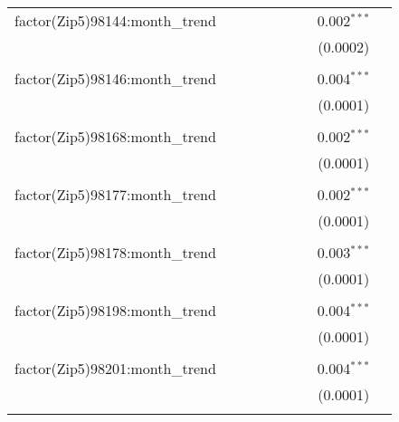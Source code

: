 \begin{table}[H]
{\begin{tabular}{@{\extracolsep{5pt}}lcccccccc}
  factor(Zip5)98144:month\_trend &  &  &  &  &  &  & 0.002$^{***}$ &  \\  

   &  &  &  &  &  &  & (0.0002) &  \\  

   & & & & & & & & \\  

  factor(Zip5)98146:month\_trend &  &  &  &  &  &  & 0.004$^{***}$ &  \\  

   &  &  &  &  &  &  & (0.0001) &  \\  

   & & & & & & & & \\  

  factor(Zip5)98168:month\_trend &  &  &  &  &  &  & 0.002$^{***}$ &  \\  

   &  &  &  &  &  &  & (0.0001) &  \\  

   & & & & & & & & \\  

  factor(Zip5)98177:month\_trend &  &  &  &  &  &  & 0.002$^{***}$ &  \\  

   &  &  &  &  &  &  & (0.0001) &  \\  

   & & & & & & & & \\  

  factor(Zip5)98178:month\_trend &  &  &  &  &  &  & 0.003$^{***}$ &  \\  

   &  &  &  &  &  &  & (0.0001) &  \\  

   & & & & & & & & \\  

  factor(Zip5)98198:month\_trend &  &  &  &  &  &  & 0.004$^{***}$ &  \\  

   &  &  &  &  &  &  & (0.0001) &  \\  

   & & & & & & & & \\  

  factor(Zip5)98201:month\_trend &  &  &  &  &  &  & 0.004$^{***}$ &  \\  

   &  &  &  &  &  &  & (0.0001) &  \\  

   & & & & & & & & \\  


\end{tabular}}
\end{table}
